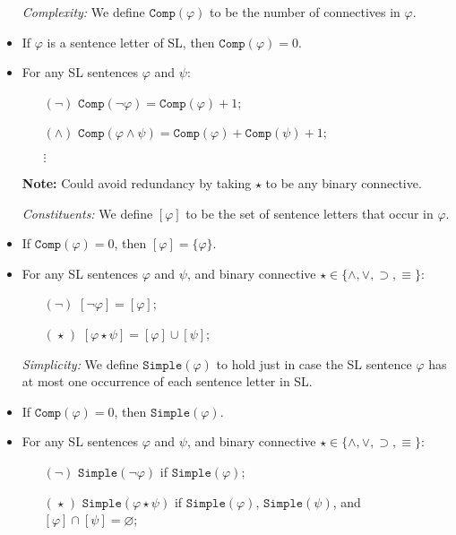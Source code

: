 \documentclass[a4paper, 11pt]{article} %
\newcommand{\set}[1]{\lbrace#1\rbrace} %
\newcommand{\comp}{\texttt{Comp}}
\newcommand{\simp}{\texttt{Simple}}
\begin{document}
\begin{itemize}
  \item[\it Complexity:] We define $\comp(\varphi)$ to be the number of connectives in $\varphi$.
      \item If $\varphi$ is a sentence letter of SL, then $\comp(\varphi)=0$.
      \item For any SL sentences $\varphi$ and $\psi$: 
    \begin{itemize}
      \item[$(\neg)$] $\comp(\neg \varphi)=\comp(\varphi)+1$;
      \item[$(\wedge)$] $\comp(\varphi \wedge \psi)=\comp(\varphi)+\comp(\psi)+1$;
      \item[] $\vdots$
    \end{itemize}
  \item[\bf Note:] Could avoid redundancy by taking $\star$ to be any binary connective. 
  \item[\it Constituents:] We define $[\varphi]$ to be the set of sentence letters that occur in $\varphi$. %
      \item If $\comp(\varphi)=0$, then $[\varphi]=\set{\varphi}$.
      \item For any SL sentences $\varphi$ and $\psi$, and binary connective $\star\in\set{\wedge,\vee,\supset,\equiv}$: 
    \begin{itemize}
      \item[$(\neg)$] $[\neg \varphi]=[\varphi]$;
      \item[$(\hspace{1pt}\star\hspace{1pt})$] $[\varphi \star \psi]=[\varphi] \cup [\psi]$;
    \end{itemize}
  \item[\it Simplicity:] We define $\simp(\varphi)$ to hold just in case the SL sentence $\varphi$ has at most one occurrence of each sentence letter in SL.
      \item If $\comp(\varphi)=0$, then $\simp(\varphi)$.
      \item For any SL sentences $\varphi$ and $\psi$, and binary connective $\star\in\set{\wedge,\vee,\supset,\equiv}$: 
    \begin{itemize}
      \item[$(\neg)$] $\simp(\neg \varphi)$ if $\simp(\varphi)$;
      \item[$(\hspace{1pt}\star\hspace{1pt})$] $\simp(\varphi \star \psi)$ if $\simp(\varphi)$, $\simp(\psi)$, and $[\varphi]\cap[\psi]=\varnothing$;

\end{itemize}
\end{itemize}
\end{document}
